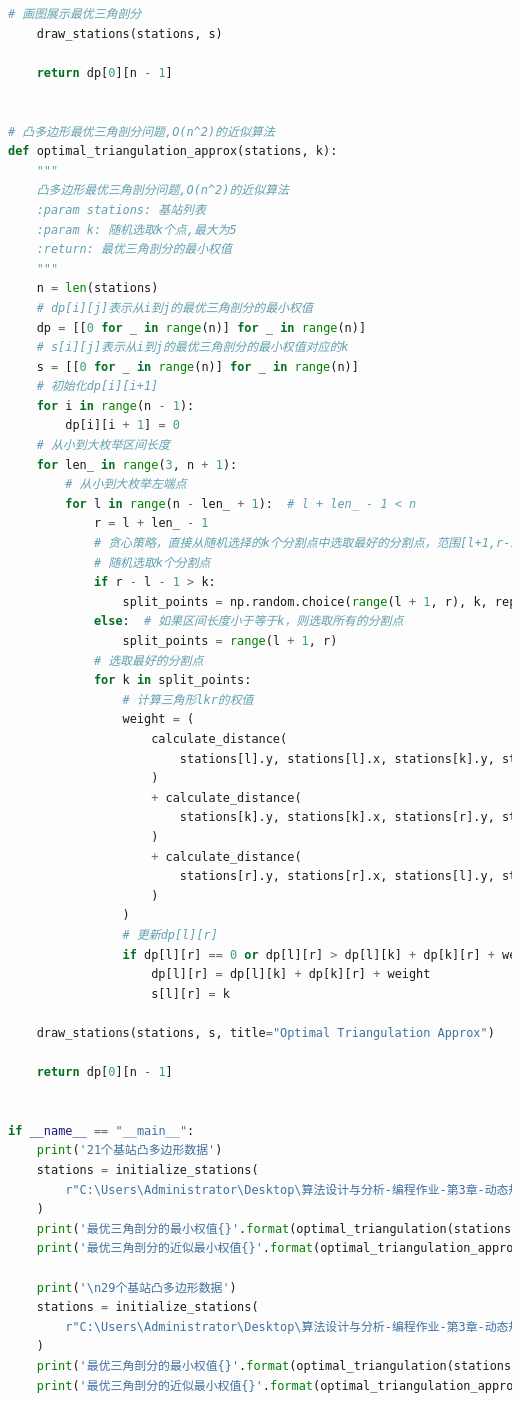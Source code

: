 \documentclass[lang=cn,11pt,a4paper]{elegantpaper}
\begin{document}
\begin{lstlisting}[language=python]
    # 画图展示最优三角剖分
    draw_stations(stations, s)

    return dp[0][n - 1]


# 凸多边形最优三角剖分问题,O(n^2)的近似算法
def optimal_triangulation_approx(stations, k):
    """
    凸多边形最优三角剖分问题,O(n^2)的近似算法
    :param stations: 基站列表
    :param k: 随机选取k个点,最大为5
    :return: 最优三角剖分的最小权值
    """
    n = len(stations)
    # dp[i][j]表示从i到j的最优三角剖分的最小权值
    dp = [[0 for _ in range(n)] for _ in range(n)]
    # s[i][j]表示从i到j的最优三角剖分的最小权值对应的k
    s = [[0 for _ in range(n)] for _ in range(n)]
    # 初始化dp[i][i+1]
    for i in range(n - 1):
        dp[i][i + 1] = 0
    # 从小到大枚举区间长度
    for len_ in range(3, n + 1):
        # 从小到大枚举左端点
        for l in range(n - len_ + 1):  # l + len_ - 1 < n
            r = l + len_ - 1
            # 贪心策略，直接从随机选择的k个分割点中选取最好的分割点，范围[l+1,r-1]
            # 随机选取k个分割点
            if r - l - 1 > k:
                split_points = np.random.choice(range(l + 1, r), k, replace=False)
            else:  # 如果区间长度小于等于k，则选取所有的分割点
                split_points = range(l + 1, r)
            # 选取最好的分割点
            for k in split_points:
                # 计算三角形lkr的权值
                weight = (
                    calculate_distance(
                        stations[l].y, stations[l].x, stations[k].y, stations[k].x
                    )
                    + calculate_distance(
                        stations[k].y, stations[k].x, stations[r].y, stations[r].x
                    )
                    + calculate_distance(
                        stations[r].y, stations[r].x, stations[l].y, stations[l].x
                    )
                )
                # 更新dp[l][r]
                if dp[l][r] == 0 or dp[l][r] > dp[l][k] + dp[k][r] + weight:
                    dp[l][r] = dp[l][k] + dp[k][r] + weight
                    s[l][r] = k

    draw_stations(stations, s, title="Optimal Triangulation Approx")

    return dp[0][n - 1]


if __name__ == "__main__":
    print('21个基站凸多边形数据')
    stations = initialize_stations(
        r"C:\Users\Administrator\Desktop\算法设计与分析-编程作业-第3章-动态规划-2023-301-304\附件3-1.21个基站凸多边形数据-2023.xls"
    )
    print('最优三角剖分的最小权值{}'.format(optimal_triangulation(stations)))
    print('最优三角剖分的近似最小权值{}'.format(optimal_triangulation_approx(stations, 5)))

    print('\n29个基站凸多边形数据')
    stations = initialize_stations(
        r"C:\Users\Administrator\Desktop\算法设计与分析-编程作业-第3章-动态规划-2023-301-304\附件3-2.29个基站凸多边形数据-2023.xls"
    )
    print('最优三角剖分的最小权值{}'.format(optimal_triangulation(stations)))
    print('最优三角剖分的近似最小权值{}'.format(optimal_triangulation_approx(stations, 5)))
\end{lstlisting}
\end{document}
